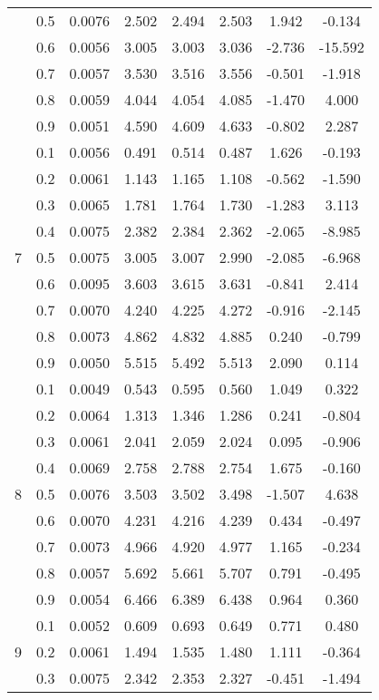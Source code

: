 \documentclass[11pt,a4paper]{report}
\begin{document}
\begin{longtable}{ | c | c || c | c | c | c | c | c | }
 & 0.5 & 0.0076 & 2.502 & 2.494 & 2.503 & 1.942 & -0.134 \\
 & 0.6 & 0.0056 & 3.005 & 3.003 & 3.036 & -2.736 & -15.592 \\
 & 0.7 & 0.0057 & 3.530 & 3.516 & 3.556 & -0.501 & -1.918 \\
 & 0.8 & 0.0059 & 4.044 & 4.054 & 4.085 & -1.470 & 4.000 \\
 & 0.9 & 0.0051 & 4.590 & 4.609 & 4.633 & -0.802 & 2.287 \\
 \hline
\multirow{9}{*}{7} & 0.1 & 0.0056 & 0.491 & 0.514 & 0.487 & 1.626 & -0.193 \\
 & 0.2 & 0.0061 & 1.143 & 1.165 & 1.108 & -0.562 & -1.590 \\
 & 0.3 & 0.0065 & 1.781 & 1.764 & 1.730 & -1.283 & 3.113 \\
 & 0.4 & 0.0075 & 2.382 & 2.384 & 2.362 & -2.065 & -8.985 \\
 & 0.5 & 0.0075 & 3.005 & 3.007 & 2.990 & -2.085 & -6.968 \\
 & 0.6 & 0.0095 & 3.603 & 3.615 & 3.631 & -0.841 & 2.414 \\
 & 0.7 & 0.0070 & 4.240 & 4.225 & 4.272 & -0.916 & -2.145 \\
 & 0.8 & 0.0073 & 4.862 & 4.832 & 4.885 & 0.240 & -0.799 \\
 & 0.9 & 0.0050 & 5.515 & 5.492 & 5.513 & 2.090 & 0.114 \\
 \hline
\multirow{9}{*}{8} & 0.1 & 0.0049 & 0.543 & 0.595 & 0.560 & 1.049 & 0.322 \\
 & 0.2 & 0.0064 & 1.313 & 1.346 & 1.286 & 0.241 & -0.804 \\
 & 0.3 & 0.0061 & 2.041 & 2.059 & 2.024 & 0.095 & -0.906 \\
 & 0.4 & 0.0069 & 2.758 & 2.788 & 2.754 & 1.675 & -0.160 \\
 & 0.5 & 0.0076 & 3.503 & 3.502 & 3.498 & -1.507 & 4.638 \\
 & 0.6 & 0.0070 & 4.231 & 4.216 & 4.239 & 0.434 & -0.497 \\
 & 0.7 & 0.0073 & 4.966 & 4.920 & 4.977 & 1.165 & -0.234 \\
 & 0.8 & 0.0057 & 5.692 & 5.661 & 5.707 & 0.791 & -0.495 \\
 & 0.9 & 0.0054 & 6.466 & 6.389 & 6.438 & 0.964 & 0.360 \\
 \hline
\multirow{9}{*}{9} & 0.1 & 0.0052 & 0.609 & 0.693 & 0.649 & 0.771 & 0.480 \\
 & 0.2 & 0.0061 & 1.494 & 1.535 & 1.480 & 1.111 & -0.364 \\
 & 0.3 & 0.0075 & 2.342 & 2.353 & 2.327 & -0.451 & -1.494 \\

\end{longtable}
\end{document}
